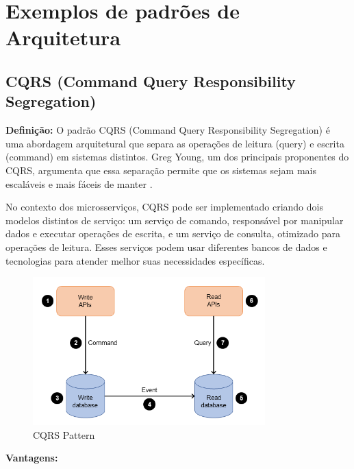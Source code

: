 \section{Exemplos de padrões de Arquitetura}
\subsection{CQRS (Command Query Responsibility Segregation)}

\textbf{Definição:} O padrão CQRS (Command Query Responsibility Segregation) é uma abordagem arquitetural que separa as operações de leitura (query) e escrita (command) em sistemas distintos. Greg Young, um dos principais proponentes do CQRS, argumenta que essa separação permite que os sistemas sejam mais escaláveis e mais fáceis de manter \cite{young2010}.

No contexto dos microsserviços, CQRS pode ser implementado criando dois modelos distintos de serviço: um serviço de comando, responsável por manipular dados e executar operações de escrita, e um serviço de consulta, otimizado para operações de leitura. Esses serviços podem usar diferentes bancos de dados e tecnologias para atender melhor suas necessidades específicas.

\begin{figure}[h]
    \centering
    \includegraphics[width=0.8\textwidth]{figuras/cqrs.png}
    \caption{CQRS Pattern}
    \label{fig:cqrs_pattern}
\end{figure}

\textbf{Vantagens:}

